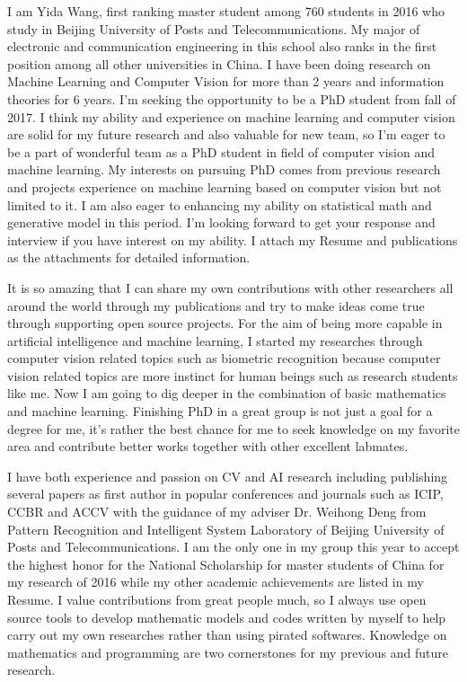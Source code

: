 \documentclass[11pt, a4paper]{awesome-cv} %
\begin{document}
\makecvheader %



I am Yida Wang, first ranking master student among 760 students in 2016 who study in Beijing University of Posts and Telecommunications. My major of electronic and communication engineering in this school also ranks in the first position among all other universities in China. I have been doing research on Machine Learning and Computer Vision for more than 2 years and information theories for 6 years. I'm seeking the opportunity to be a PhD student from fall of 2017. I think my ability and experience on machine learning and computer vision are solid for my future research and also valuable for new team, so I'm eager to be a part of wonderful team as a PhD student in field of computer vision and machine learning. My interests on pursuing PhD comes from previous research and projects experience on machine learning based on computer vision but not limited to it. I am also eager to enhancing my ability on statistical math and generative model in this period. I'm looking forward to get your response and interview if you have interest on my ability. I attach my Resume and publications as the attachments for detailed information.

It is so amazing that I can share my own contributions with other researchers all around the world through my publications and try to make ideas come true through supporting open source projects. For the aim of being more capable in artificial intelligence and machine learning, I started my researches through computer vision related topics such as biometric recognition because computer vision related topics are more instinct for human beings such as research students like me. Now I am going to dig deeper in the combination of basic mathematics and machine learning. Finishing PhD in a great group is not just a goal for a degree for me, it's rather the best chance for me to seek knowledge on my favorite area and contribute better works together with other excellent labmates.


I have both experience and passion on CV and AI research including publishing several papers as first author in popular conferences and journals such as ICIP, CCBR and ACCV with the guidance of my adviser Dr. Weihong Deng from Pattern Recognition and Intelligent System Laboratory of Beijing University of Posts and Telecommunications. I am the only one in my group this year to accept the highest honor for the National Scholarship for master students of China for my research of 2016 while my other academic achievements are listed in my Resume. I value contributions from great people much, so I always use open source tools to develop mathematic models and codes written by myself to help carry out my own researches rather than using pirated softwares. Knowledge on mathematics and programming are two cornerstones for my previous and future research.
\end{document}
